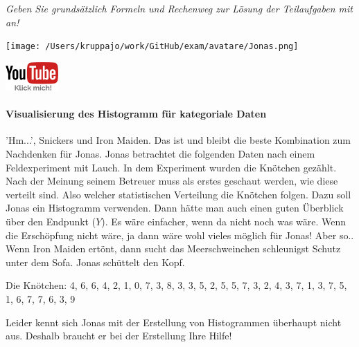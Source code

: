 \documentclass[a4paper, 9pt]{scrartcl}\usepackage[]{graphicx}\usepackage[]{xcolor}
\begin{document}
\textit{Geben Sie grundsätzlich Formeln und Rechenweg zur Lösung der Teilaufgaben mit an!} \\[1Ex]
 

 
\begin{minipage}[t]{0.5\textwidth}
\texttt{[image: /Users/kruppajo/work/GitHub/exam/avatare/Jonas.png]}
\end{minipage}
\begin{minipage}[t]{0.5\textwidth}
\hfill
\href{https://youtu.be/aXvxGC4YLqk}{\includegraphics[width = 2cm]{img/youtube}}
\end{minipage}
\vspace{-3ex}



\paragraph{Visualisierung des Histogramm für kategoriale Daten}

'Hm...', Snickers und Iron Maiden. Das ist und bleibt die beste Kombination zum Nachdenken für Jonas. Jonas betrachtet die folgenden Daten nach einem Feldexperiment mit Lauch. In dem Experiment wurden die Knötchen gezählt. Nach der Meinung seinem Betreuer muss als erstes geschaut werden, wie diese verteilt sind. Also welcher statistischen Verteilung die Knötchen folgen. Dazu soll Jonas ein Histogramm verwenden. Dann hätte man auch einen guten Überblick über den Endpunkt ($Y$). Es wäre einfacher, wenn da nicht noch was wäre. Wenn die Erschöpfung nicht wäre, ja dann wäre wohl vieles möglich für Jonas! Aber so.. Wenn Iron Maiden ertönt, dann sucht das Meerschweinchen schleunigst Schutz unter dem Sofa. Jonas schüttelt den Kopf.

\begin{center}
Die Knötchen: 4, 6, 6, 4, 2, 1, 0, 7, 3, 8, 3, 3, 5, 2, 5, 5, 7, 3, 2, 4, 3, 7, 1, 3, 7, 5, 1, 6, 7, 7, 6, 3, 9
\end{center}

Leider kennt sich Jonas mit der Erstellung von Histogrammen überhaupt nicht aus. Deshalb braucht er bei der Erstellung Ihre Hilfe!
\end{document}
